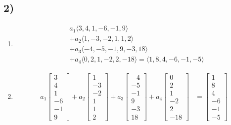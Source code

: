 \documentclass{article}
\begin{document}
\subsection{2)}
\begin{enumerate}[label = \textbf{\alph*)}]
	\item
		\begin{align*}
			& a_1 \langle 3, 4, 1, -6, -1, 9 \rangle \\
			& + a_2 \langle 1, -3, -2, 1, 1, 2 \rangle \\
			& + a_3 \langle -4, -5, -1, 9, -3, 18 \rangle \\
			& + a_4 \langle 0, 2, 1, -2, 2, -18 \rangle = \langle 1, 8, 4, -6, -1, -5 \rangle
		\end{align*}
	\item
		\begin{align*}
			a_1 \begin{bmatrix} 3 \\ 4 \\ 1 \\ -6 \\ -1 \\ 9 \end{bmatrix}
			+ a_2 \begin{bmatrix} 1 \\ -3 \\ -2 \\ 1 \\ 1 \\ 2 \end{bmatrix}
			+ a_3 \begin{bmatrix} -4 \\ -5 \\ -1 \\ 9 \\ -3 \\ 18 \end{bmatrix}
			+ a_4 \begin{bmatrix} 0 \\ 2 \\ 1 \\ -2 \\ 2 \\ -18 \end{bmatrix}
			& = \begin{bmatrix} 1 \\ 8 \\ 4 \\ -6 \\ -1 \\ -5 \end{bmatrix}

\end{align*}
\end{enumerate}
\end{document}
